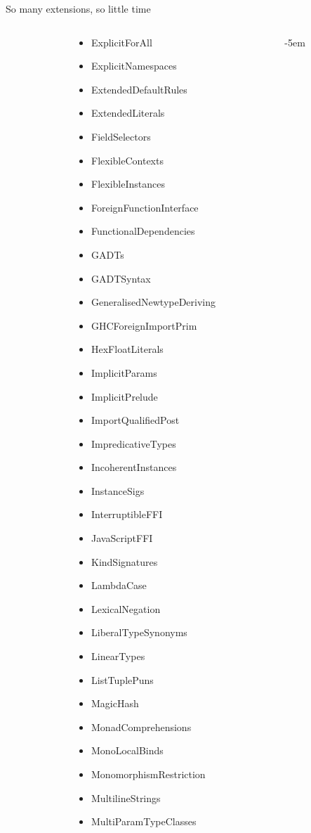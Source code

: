 \documentclass[handout]{beamer}
\begin{document}
\begin{frame}{So many extensions, so little time}
\begin{columns}[T]
\begin{column}{.33\textwidth}
  \end{column}
  \begin{column}{.35\textwidth}
    \begin{itemize}\itemsep0mm\itemindent-3.2em
      \item ExplicitForAll \item ExplicitNamespaces \item ExtendedDefaultRules \item ExtendedLiterals \item FieldSelectors \item FlexibleContexts \item FlexibleInstances \item ForeignFunctionInterface \item FunctionalDependencies \item GADTs \item GADTSyntax \item GeneralisedNewtypeDeriving \item GHCForeignImportPrim \item HexFloatLiterals \item ImplicitParams \item ImplicitPrelude \item ImportQualifiedPost \item ImpredicativeTypes \item IncoherentInstances \item InstanceSigs \item InterruptibleFFI \item JavaScriptFFI \item KindSignatures \item LambdaCase \item LexicalNegation \item LiberalTypeSynonyms \item LinearTypes \item ListTuplePuns \item MagicHash \item MonadComprehensions \item MonoLocalBinds \item MonomorphismRestriction \item MultilineStrings \item MultiParamTypeClasses
    \end{itemize}
  \end{column}
  \begin{column}{.32\textwidth}
    \begin{itemize}\itemsep0mm\itemindent-5em

\end{itemize}
\end{column}
\end{columns}
\end{frame}
\end{document}

